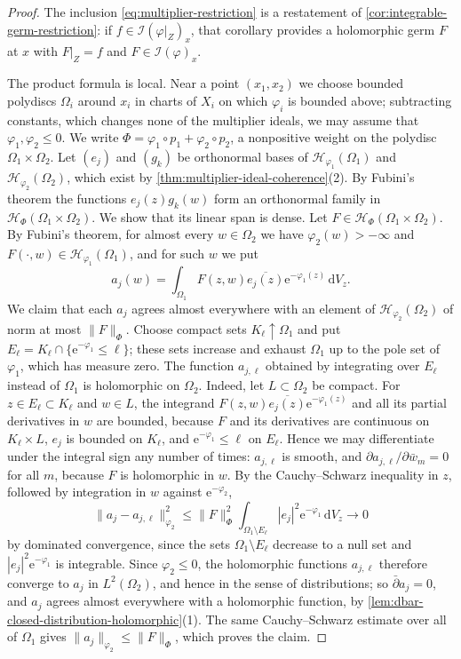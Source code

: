 \begin{proof}
The inclusion \eqref{eq:multiplier-restriction} is a restatement of \cref{cor:integrable-germ-restriction}: if $f\in\mathcal I(\varphi|_Z)_x$, that corollary provides a holomorphic germ $F$ at $x$ with $F|_Z=f$ and $F\in\mathcal I(\varphi)_x$.

The product formula is local. Near a point $(x_1,x_2)$ we choose bounded polydiscs $\Omega_i$ around $x_i$ in charts of $X_i$ on which $\varphi_i$ is bounded above; subtracting constants, which changes none of the multiplier ideals, we may assume that $\varphi_1,\varphi_2\leq0$. We write $\Phi=\varphi_1\circ p_1+\varphi_2\circ p_2$, a nonpositive weight on the polydisc $\Omega_1\times\Omega_2$. Let $(e_j)$ and $(g_k)$ be orthonormal bases of $\mathcal H_{\varphi_1}(\Omega_1)$ and $\mathcal H_{\varphi_2}(\Omega_2)$, which exist by \cref{thm:multiplier-ideal-coherence}(2). By Fubini's theorem the functions $e_j(z)g_k(w)$ form an orthonormal family in $\mathcal H_\Phi(\Omega_1\times\Omega_2)$. We show that its linear span is dense. Let $F\in\mathcal H_\Phi(\Omega_1\times\Omega_2)$. By Fubini's theorem, for almost every $w\in\Omega_2$ we have $\varphi_2(w)>-\infty$ and $F(\cdot,w)\in\mathcal H_{\varphi_1}(\Omega_1)$, and for such $w$ we put
\[
 a_j(w)=\int_{\Omega_1}F(z,w)\overline{e_j(z)}
                                  \mathrm e^{-\varphi_1(z)}\,\mathrm dV_z.
\]
We claim that each $a_j$ agrees almost everywhere with an element of $\mathcal H_{\varphi_2}(\Omega_2)$ of norm at most $\|F\|_\Phi$. Choose compact sets $K_\ell\uparrow\Omega_1$ and put $E_\ell=K_\ell\cap\{\mathrm e^{-\varphi_1}\leq\ell\}$; these sets increase and exhaust $\Omega_1$ up to the pole set of $\varphi_1$, which has measure zero. The function $a_{j,\ell}$ obtained by integrating over $E_\ell$ instead of $\Omega_1$ is holomorphic on $\Omega_2$. Indeed, let $L\subset\Omega_2$ be compact. For $z\in E_\ell\subset K_\ell$ and $w\in L$, the integrand $F(z,w)\overline{e_j(z)}\mathrm e^{-\varphi_1(z)}$ and all its partial derivatives in $w$ are bounded, because $F$ and its derivatives are continuous on $K_\ell\times L$, $e_j$ is bounded on $K_\ell$, and $\mathrm e^{-\varphi_1}\leq\ell$ on $E_\ell$. Hence we may differentiate under the integral sign any number of times: $a_{j,\ell}$ is smooth, and $\partial a_{j,\ell}/\partial\bar w_m=0$ for all $m$, because $F$ is holomorphic in $w$. By the Cauchy--Schwarz inequality in $z$, followed by integration in $w$ against $\mathrm e^{-\varphi_2}$,
\[
 \|a_j-a_{j,\ell}\|_{\varphi_2}^2
 \leq\|F\|_\Phi^2
       \int_{\Omega_1\setminus E_\ell}|e_j|^2\mathrm e^{-\varphi_1}\,\mathrm dV_z
 \longrightarrow0
\]
by dominated convergence, since the sets $\Omega_1\setminus E_\ell$ decrease to a null set and $|e_j|^2\mathrm e^{-\varphi_1}$ is integrable. Since $\varphi_2\leq0$, the holomorphic functions $a_{j,\ell}$ therefore converge to $a_j$ in $L^2(\Omega_2)$, and hence in the sense of distributions; so $\bar\partial a_j=0$, and $a_j$ agrees almost everywhere with a holomorphic function, by \cref{lem:dbar-closed-distribution-holomorphic}(1). The same Cauchy--Schwarz estimate over all of $\Omega_1$ gives $\|a_j\|_{\varphi_2}\leq\|F\|_\Phi$, which proves the claim.


\end{proof}
